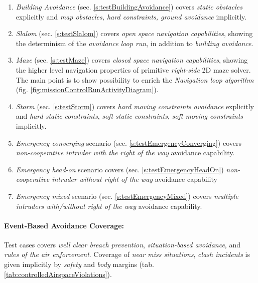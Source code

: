 \begin{enumerate}
    \item \emph{Building Avoidance} (sec. \ref{s:testBuildingAvoidance}) covers \emph{static obstacles} explicitly and \emph{map obstacles, hard constraints, ground avoidance} implicitly.
    
    \item \emph{Slalom} (sec. \ref{s:testSlalom}) covers \emph{open space navigation capabilities}, showing the determinism of the \emph{avoidance loop run}, in addition to \emph{building avoidance}.
    
    \item \emph{Maze} (sec. \ref{s:testMaze}) covers \emph{closed space navigation capabilities}, showing the higher level navigation properties of primitive \emph{right-side} 2D maze solver. The main point is to show possibility to enrich the \emph{Navigation loop algorithm} (fig. \ref{fig:missionControlRunActivityDiagram}).
    
    \item \emph{Storm} (sec. \ref{s:testStorm}) covers \emph{hard moving constraints avoidance} explicitly and \emph{hard static constraints}, \emph{soft static constraints}, \emph{soft moving constraints} implicitly.
    
    \item \emph{Emergency converging} scenario (sec. \ref{s:testEmergencyConverging}) covers \emph{non-cooperative intruder with the right of the way} avoidance capability.
    
    \item \emph{Emergency head-on} scenario covers (sec. \ref{s:testEmergencyHeadOn}) \emph{non-cooperative intruder without right of the way} avoidance capability
    
    \item \emph{Emergency mixed} scenario (sec. \ref{s:testEmergencyMixed}) covers \emph{multiple intruders with/without right of the way} avoidance capability.
\end{enumerate}

\paragraph{Event-Based Avoidance Coverage:} Test cases covers \emph{well clear breach prevention}, \emph{situation-based avoidance}, and \emph{rules of the air enforcement}. Coverage of \emph{near miss situations}, \emph{clash incidents} is given implicitly by \emph{safety} and \emph{body} margins (tab. \ref{tab:controlledAirspaceViolations}).

